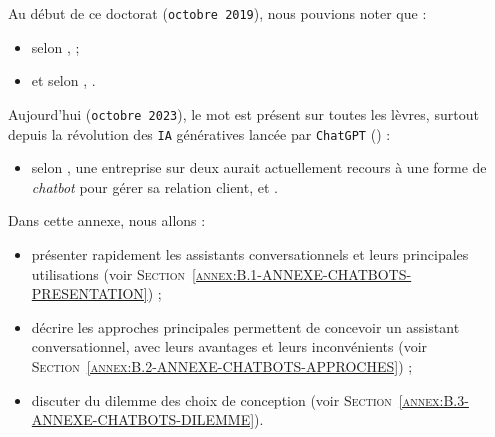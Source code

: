 \DontFrameThisInToc
{}
\label{annex:B-ANNEXE-CHATBOTS}
	
	
	Au début de ce doctorat (\texttt{octobre 2019}), nous pouvions noter que :
	\begin{itemize}
		\item selon \cite{costello-lodolce:2019:gartner-top-technologies},  ;
		\item et selon \cite{goasduff:2019:chatbots-will-appeal}, .
	\end{itemize}
	
	Aujourd'hui (\texttt{octobre 2023}), le mot  est présent sur toutes les lèvres, surtout depuis la révolution des \texttt{IA} génératives lancée par \texttt{ChatGPT} (\cite{openai:2023:chatgpt}) :
	\begin{itemize}
		\item selon \cite{costello-lodolce:2022:gartner-predicts-chatbots}, une entreprise sur deux aurait actuellement recours à une forme de \textit{chatbot} pour gérer sa relation client, et .
	\end{itemize}

	Dans cette annexe, nous allons :
	\begin{itemize}
		\item présenter rapidement les assistants conversationnels et leurs principales utilisations (voir \textsc{Section~\ref{annex:B.1-ANNEXE-CHATBOTS-PRESENTATION}}) ;
		\item décrire les approches principales permettent de concevoir un assistant conversationnel, avec leurs avantages et leurs inconvénients (voir \textsc{Section~\ref{annex:B.2-ANNEXE-CHATBOTS-APPROCHES}}) ;
		\item discuter du dilemme des choix de conception (voir \textsc{Section~\ref{annex:B.3-ANNEXE-CHATBOTS-DILEMME}}).
	\end{itemize}
	
